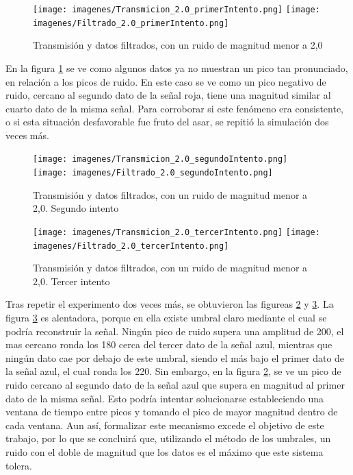 \documentclass[12pt,letterpaper]{article}     %
\begin{document}
\clearpage

\begin{figure}[!ht]
\centering
\texttt{[image: imagenes/Transmicion\_2.0\_primerIntento.png]}
\texttt{[image: imagenes/Filtrado\_2.0\_primerIntento.png]}
\caption{Transmisión y datos filtrados, con un ruido de magnitud menor a 2,0}
\label{fig:filtro201}
\end{figure}

En la figura \ref{fig:filtro201} se ve como algunos datos ya no muestran un pico tan pronunciado,
en relación a los picos de ruido. En este caso se ve como un pico negativo de ruido,
cercano al segundo dato de la señal roja, tiene una magnitud similar al cuarto dato de la misma señal.
Para corroborar si este fenómeno era consistente, o si esta situación desfavorable fue fruto del asar,
se repitió la simulación dos veces más.

\begin{figure}[!ht]
\centering
\texttt{[image: imagenes/Transmicion\_2.0\_segundoIntento.png]}
\texttt{[image: imagenes/Filtrado\_2.0\_segundoIntento.png]}
\caption{Transmisión y datos filtrados, con un ruido de magnitud menor a 2,0. Segundo intento}
\label{fig:filtro202}
\end{figure}

\begin{figure}[!ht]
\centering
\texttt{[image: imagenes/Transmicion\_2.0\_tercerIntento.png]}
\texttt{[image: imagenes/Filtrado\_2.0\_tercerIntento.png]}
\caption{Transmisión y datos filtrados, con un ruido de magnitud menor a 2,0. Tercer intento}
\label{fig:filtro203}
\end{figure}

Tras repetir el experimento dos veces más, se obtuvieron las figureas \ref{fig:filtro202}
y \ref{fig:filtro203}. La figura \ref{fig:filtro203} es alentadora, porque en ella existe umbral
claro mediante el cual se podría reconstruir la señal. Ningún pico de ruido supera una amplitud de 200,
el mas cercano ronda los 180 cerca del tercer dato de la señal azul, mientras que ningún dato cae por
debajo de este umbral, siendo el más bajo el primer dato de la señal azul, el cual ronda los 220.
Sin embargo, en la figura \ref{fig:filtro202}, se ve un pico de ruido cercano al segundo dato de la
señal azul que supera en magnitud al primer dato de la misma señal. Esto podría intentar solucionarse
estableciendo una ventana de tiempo entre picos y tomando el pico de mayor magnitud dentro de cada ventana.
Aun así, formalizar este mecanismo excede el objetivo de este trabajo, por lo que se concluirá que,
utilizando el método de los umbrales, un ruido con el doble de magnitud que los datos es el máximo que este
sistema tolera.
\end{document}
